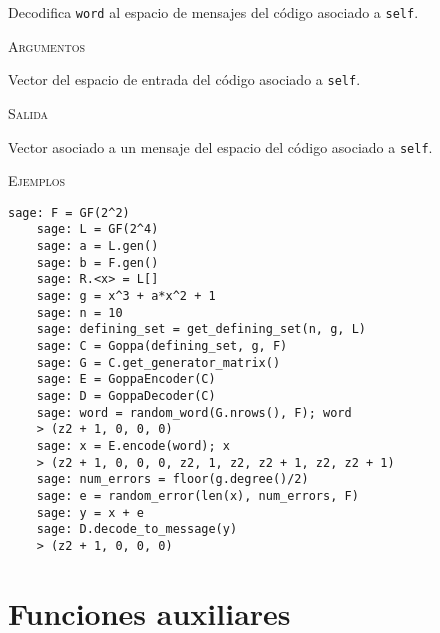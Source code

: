 \begin{description}[leftmargin=1em, font=\normalfont\ttfamily, style=nextline]
\begin{description}[font=\ttfamily, style=nextline]
  \item[decode\_to\_message(self, word)] Decodifica \texttt{word} al espacio de mensajes del código asociado a \texttt{self}.
      
  \textsc{Argumentos}
  \begin{description}[font=\normalfont\ttfamily]
      \item[word] Vector del espacio de entrada del código asociado a \texttt{self}.
  \end{description}

  \textsc{Salida}
  \begin{description}[font=\normalfont\ttfamily]
      \item[] Vector asociado a un mensaje del espacio del código asociado a \texttt{self}.
  \end{description}

  \textsc{Ejemplos}
  \begin{lstlisting}[gobble=4]
    sage: F = GF(2^2)
    sage: L = GF(2^4)
    sage: a = L.gen()
    sage: b = F.gen()
    sage: R.<x> = L[]
    sage: g = x^3 + a*x^2 + 1
    sage: n = 10
    sage: defining_set = get_defining_set(n, g, L)
    sage: C = Goppa(defining_set, g, F)
    sage: G = C.get_generator_matrix()
    sage: E = GoppaEncoder(C)
    sage: D = GoppaDecoder(C)
    sage: word = random_word(G.nrows(), F); word
    > (z2 + 1, 0, 0, 0)
    sage: x = E.encode(word); x
    > (z2 + 1, 0, 0, 0, z2, 1, z2, z2 + 1, z2, z2 + 1)
    sage: num_errors = floor(g.degree()/2)
    sage: e = random_error(len(x), num_errors, F)
    sage: y = x + e
    sage: D.decode_to_message(y)
    > (z2 + 1, 0, 0, 0)
  \end{lstlisting}
  \end{description}
\end{description}

\section{Funciones auxiliares}

